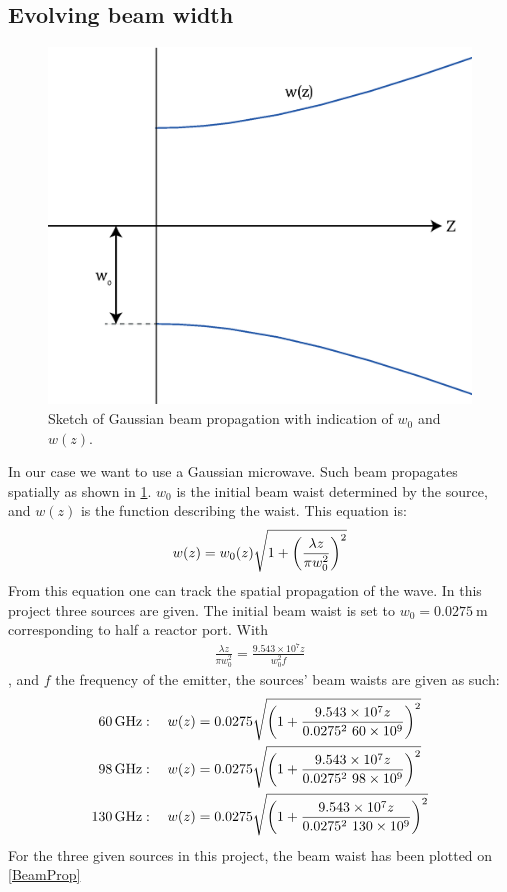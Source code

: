 \subsection{Evolving beam width}
\begin{figure}
	\vspace{-5mm}
	\includegraphics[width=.4\textwidth]{Figures/PropEx.eps}
	\caption{Sketch of Gaussian beam propagation with indication of \(w_0\) and \(w(z)\).}
	\label{PropEx}
\end{figure}
In our case we want to use a Gaussian microwave. Such beam propagates spatially as shown in \cref{PropEx}.
\(w_0\) is the initial beam waist determined by the source, and \(w(z)\) is the function describing the waist. This equation is:
\begin{align}
	w(z) = w_0(z)\sqrt{1+\pqty{\frac{\lambda z}{\pi w_0^2}}^2}\label{wz}
\end{align}
From this equation one can track the spatial propagation of the wave. In this project three sources are given. The initial beam waist is set to \(w_0=\SI{0.0275}{\meter}\) corresponding to half a reactor port. With
\begin{align}
	\frac{\lambda z}{\pi w_0^2} = \frac{9.543\times10^7 z}{w_0^2 f}
\end{align}
, and \(f\) the frequency of the emitter, the sources' beam waists are given as such:
\begin{align}
	\SI{60}{\giga\hertz}  & : \quad w(z)=0.0275\sqrt{\pqty{1+\frac{9.543\times10^7 z}{0.0275^2 \ 60\times10^9}}^2}\label{60}   \\
	\SI{98}{\giga\hertz}  & : \quad w(z)=0.0275\sqrt{\pqty{1+\frac{9.543\times10^7 z}{0.0275^2 \ 98\times10^9}}^2}\label{98}   \\
	\SI{130}{\giga\hertz} & : \quad w(z)=0.0275\sqrt{\pqty{1+\frac{9.543\times10^7 z}{0.0275^2 \ 130\times10^9}}^2}\label{130}
\end{align}
For the three given sources in this project, the beam waist has been plotted on \cref{BeamProp}
\newline

